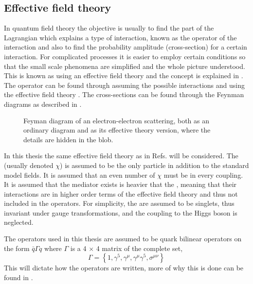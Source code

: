 \subsection{Effective field theory}\label{sec:tb:subsec:eft}
In quantum field theory the objective is usually to find the part of the Lagrangian which explains a type of interaction, known as the operator of the interaction and also to find the probability amplitude (cross-section) for a certain interaction. For complicated processes it is easier to employ certain conditions so that the small scale phenomena are simplified and the whole picture understood. This is known as using an effective field theory and the concept is explained in . The operator can be found through assuming the possible interactions and using the effective field theory \citep{Zee:2003}. The cross-sections can be found through the Feynman diagrams as described in . 
 \begin{figure}[H] %
    \hfill
    \caption{Feyman diagram of an electron-electron scattering, both as an ordinary diagram and as its effective theory version, where the details are hidden in the blob.}
    \label{fig:feymanc}
  \end{figure}
In this thesis the same effective field theory as in Refs. \citep{82.116010,Goodman:2010} will be considered. The \abbrWIMP (usually denoted $\chi$) is assumed to be the only particle in addition to the standard model fields. It is assumed that an even number of $\chi$ must be in every coupling. It is assumed that the mediator exists is heavier that the \abbrWIMPS, meaning that their interactions are in higher order terms of the effective field theory and thus not included in the operators. For simplicity, the \abbrWIMPS are assumed to be \abbrSM singlets, thus invariant under \abbrSM gauge transformations, and the coupling to the Higgs boson is neglected.

The operators used in this thesis are assumed to be quark bilinear operators on the form $\bar{q}\Gamma q$ where $\Gamma$ is a 4 $\times$ 4 matrix of the complete set, 
\begin{equation}
\Gamma = \left\lbrace 1,\gamma ^5,\gamma ^\mu,\gamma ^\mu \gamma ^5, \sigma ^{\mu \nu} \right\rbrace
\end{equation}
This will dictate how the operators are written, more of why this is done can be found in \citep{82.116010,Goodman:2010,Zee:2003}.

